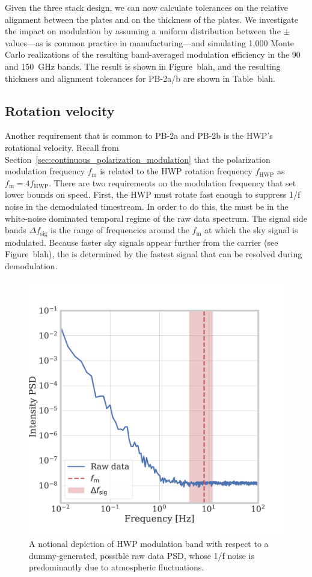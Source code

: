 Given the three stack design, we can now calculate tolerances on the relative alignment between the plates and on the thickness of the plates. We investigate the impact on modulation by assuming a uniform distribution between the $\pm$ values---as is common practice in manufacturing---and simulating 1,000 Monte Carlo realizations of the resulting band-averaged modulation efficiency in the 90 and 150~GHz bands. The result is shown in Figure~blah, and the resulting thickness and alignment tolerances for PB-2a/b are shown in Table~blah.


\subsection{Rotation velocity}
\label{sec:rotation_velocity}

Another requirement that is common to PB-2a and PB-2b is the HWP's rotational velocity. Recall from Section~\ref{sec:continuous_polarization_modulation} that the polarization modulation frequency $f_{\mathrm{m}}$ is related to the HWP rotation frequency $f_{\mathrm{HWP}}$ as $f_{\mathrm{m}} = 4 f_{\mathrm{HWP}}$. There are two requirements on the modulation frequency that set lower bounds on speed. First, the HWP must rotate fast enough to suppress 1/f noise in the demodulated timestream. In order to do this, the  must be in the white-noise dominated temporal regime of the raw data spectrum. The signal side bands $\Delta f_{\mathrm{sig}}$ is the range of frequencies around the  $f_{\mathrm{m}}$ at which the sky signal is modulated. Because faster sky signals appear further from the carrier (see Figure~blah), the  is determined by the fastest signal that can be resolved during demodulation.

\begin{figure}
    \centering
    \includegraphics[width=0.5\linewidth, trim=0cm 1cm 1cm 2cm, clip]{PolarizationModulation/Figures/hwp_rotation_frequency.pdf}
    \caption{A notional depiction of HWP modulation band with respect to a dummy-generated, possible raw data PSD, whose 1/f noise is predominantly due to atmospheric fluctuations.}
    \label{fig:hwp_rotation_frequency}
\end{figure}

